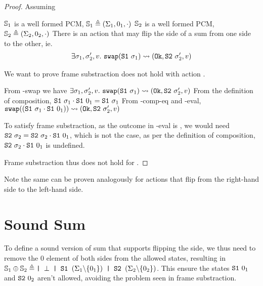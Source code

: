 \begin{proof}


Assuming
\begin{hypvlist}
 $\mathbb S_1$ is a well formed PCM, $\mathbb S_1 \triangleq (\Sigma_1, 0_1, \cdot)$
 $\mathbb S_2$ is a well formed PCM, $\mathbb S_2 \triangleq (\Sigma_2, 0_2, \cdot)$
 There is an action \swap{} that may flip the side of a sum from one side to the other, ie.
	\begin{align*}
		\exists \sigma_1,\sigma_2',v.~ \texttt{swap}(\texttt{S1}~\sigma_1)\rightsquigarrow(\texttt{Ok},\texttt{S2}~\sigma_2',v)
	\end{align*}

\end{hypvlist}

We want to prove frame substraction does not hold with action \swap.

\begin{hypvlist}
	 From \hyp{swap} we have $\exists \sigma_1,\sigma_2',v.~ \texttt{swap}(\texttt{S1}~\sigma_1)\rightsquigarrow(\texttt{Ok},\texttt{S2}~\sigma_2',v)$
	 From the definition of composition, $\texttt{S1}~\sigma_1\cdot\texttt{S1}~0_1=\texttt{S1}~\sigma_1$
	 From \hyp{comp-eq} and \hyp{eval}, $\texttt{swap}((\texttt{S1}~\sigma_1\cdot\texttt{S1}~0_1))\rightsquigarrow(\texttt{Ok},\texttt{S2}~\sigma_2',v)$
\end{hypvlist}

To satisfy frame substraction, as the outcome in \hyp{eval} is \Ok, we would need $\texttt{S2}~\sigma_2 = \texttt{S2}~\sigma_2 \cdot \texttt{S1}~0_1$, which is not the case, as per the definition of composition, $\texttt{S2}~\sigma_2 \cdot \texttt{S1}~0_1$ is undefined.

Frame substraction thus does not hold for \swap.
\end{proof}

Note the same can be proven analogously for actions that flip from the right-hand side to the left-hand side.

\section{Sound Sum}

To define a sound version of sum that supports flipping the side, we thus need to remove the $0$ element of both sides from the allowed states, resulting in $\mathbb S_1 \oplus \mathbb S_2 \triangleq \texttt{| }\bot \texttt{ | S1 } (\Sigma_1 \backslash \{ 0_1\}) \texttt{ | S2 } (\Sigma_2 \backslash \{0_2\})$. This ensure the states $\texttt{S1}~0_1$ and $\texttt{S2}~0_2$ aren't allowed, avoiding the problem seen in frame substraction.

